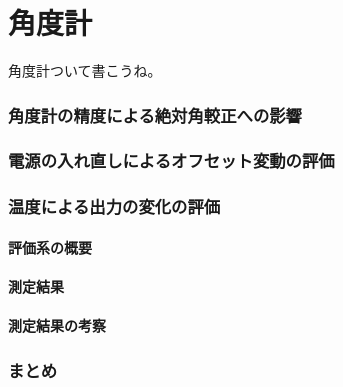 \documentclass[../../main.tex]{subfiles}
\begin{document}
\chapter{角度計}
角度計ついて書こうね。
\subsection{角度計の精度による絶対角較正への影響}
\subsection{電源の入れ直しによるオフセット変動の評価}
\subsection{温度による出力の変化の評価}
\subsubsection{評価系の概要}
\subsubsection{測定結果}
\subsubsection{測定結果の考察}
\subsection{まとめ}
\end{document}
